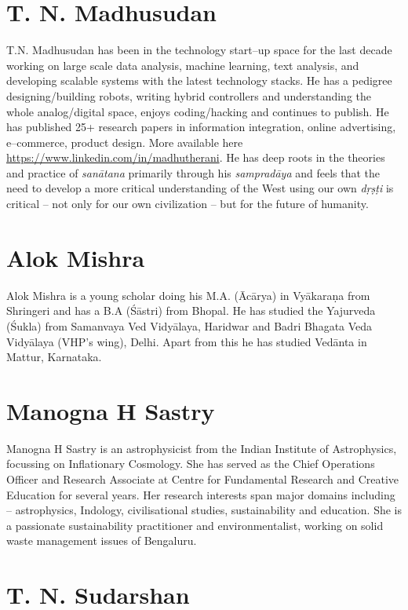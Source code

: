 \section*{T. N. Madhusudan}

T.N. Madhusudan has been in the technology start–up space for the last decade working on large scale data analysis, machine learning, text analysis, and developing scalable systems with the latest technology stacks. He has a pedigree designing/building robots, writing hybrid controllers and understanding the whole analog/digital space, enjoys coding/hacking and continues to publish. He has published 25+ research papers in information integration, online advertising, e–commerce, product design. More available here \url{https://www.linkedin.com/in/madhutherani}. He has deep roots in the theories and practice of \textit{sanātana} primarily through his \textit{sampradāya} and feels that the need to develop a more critical understanding of the West using our own \textit{dṛṣṭi} is critical – not only for our own civilization – but for the future of humanity.


\section*{Alok Mishra}

Alok Mishra is a young scholar doing his M.A. (Ācārya) in Vyākaraṇa from Shringeri and has a B.A (Śāstri) from Bhopal. He has studied the Yajurveda (Śukla) from Samanvaya Ved Vidyālaya, Haridwar and Badri Bhagata Veda Vidyālaya (VHP’s wing), Delhi. Apart from this he has studied Vedānta in Mattur, Karnataka.


\section*{Manogna H Sastry}

Manogna H Sastry is an astrophysicist from the Indian Institute of Astrophysics, focussing on Inflationary Cosmology. She has served as the Chief Operations Officer and Research Associate at Centre for Fundamental Research and Creative Education for several years. Her research interests span major domains including – astrophysics, Indology, civilisational studies, sustainability and education. She is a passionate sustainability practitioner and environmentalist, working on solid waste management issues of Bengaluru.


\section*{T. N. Sudarshan}

